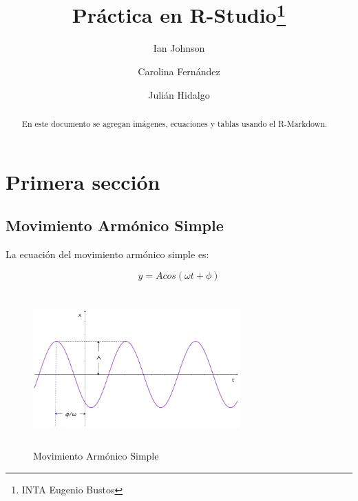 \documentclass[runningheads]{llncs}
\begin{document}
\title{Práctica en R-Studio\thanks{INTA Eugenio Bustos}}
%
%
\author{Ian Johnson \and Carolina
Fernández \and Julián
Hidalgo}


%


\maketitle              %
%
\begin{abstract}
En este documento se agregan imágenes, ecuaciones y tablas usando el
R-Markdown.


\end{abstract}

\hypertarget{primera-secciuxf3n}{%
\section{Primera sección}\label{primera-secciuxf3n}}

\hypertarget{movimiento-armuxf3nico-simple}{%
\subsection{Movimiento Armónico
Simple}\label{movimiento-armuxf3nico-simple}}

La ecuación del movimiento armónico simple es:

\begin{equation}
y = A cos(\omega t + \phi)
\end{equation}

\begin{figure}
\centering
\includegraphics[width=3.125in,height=2.34375in]{MAS.png}
\caption{Movimiento Armónico Simple}
\end{figure}
\end{document}
